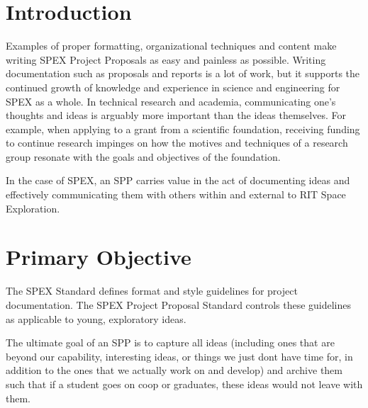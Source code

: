 \documentclass[journal]{SPEXformat}
\begin{document}
\section{Introduction}
\label{sec:introduction}
Examples of proper formatting, organizational techniques and content make writing SPEX Project Proposals as easy and painless as possible.
Writing documentation such as proposals and reports is a lot of work, but it supports the continued growth of knowledge and experience in science and engineering for SPEX as a whole.
In technical research and academia, communicating one's thoughts and ideas is arguably more important than the ideas themselves.
For example, when applying to a grant from a scientific foundation, receiving funding to continue research impinges on how the motives and techniques of a research group resonate with the goals and objectives of the foundation.

In the case of SPEX, an SPP carries value in the act of documenting ideas and effectively communicating them with others within and external to RIT Space Exploration.

\section{Primary Objective}
\label{sec:primary-obj}
The SPEX Standard defines format and style guidelines for project documentation. The SPEX Project Proposal Standard controls these guidelines as applicable to young, exploratory ideas.

The ultimate goal of an SPP is to capture all ideas (including ones that are beyond our capability, interesting ideas, or things we just dont have time for, in addition to the ones that we actually work on and develop) and archive them such that if a student goes on coop or graduates, these ideas would not leave with them.
\end{document}
